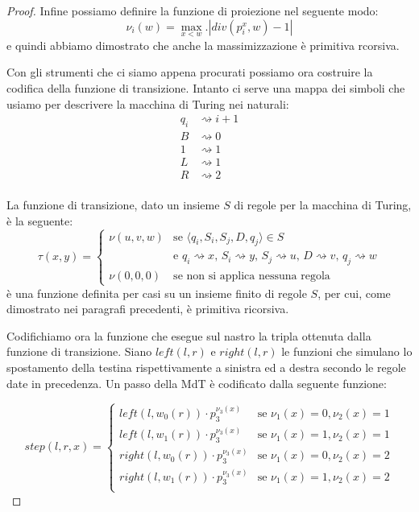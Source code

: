 \begin{proof}
Infine possiamo definire la funzione di proiezione nel seguente modo:
$$\nu_i(w) = \max_{x<w}.\left| div(p_i^x, w) - 1\right|$$ e quindi
abbiamo dimostrato che anche la massimizzazione è primitiva rcorsiva.

Con gli strumenti che ci siamo appena procurati possiamo ora costruire
la codifica della funzione di transizione. Intanto ci serve una mappa
dei simboli che usiamo per descrivere la macchina di Turing nei
naturali:
\begin{align*}
q_i &\rightsquigarrow i+1\\
B &\rightsquigarrow 0\\
1 &\rightsquigarrow 1\\
L &\rightsquigarrow 1\\
R &\rightsquigarrow 2\\
\end{align*}

La funzione di transizione, dato un insieme $S$ di regole per la
macchina di Turing, è la seguente:
$$\tau(x,y) = \left\{
\begin{array}{ll}
\nu(u,v,w) & \text{se $\langle q_i, S_i, S_j, D, q_j \rangle \in
  S$}\\ & \text{e $q_i \rightsquigarrow x$, $S_i \rightsquigarrow y$,
  $S_j \rightsquigarrow u$, $D \rightsquigarrow v$, $q_j
  \rightsquigarrow w$}\\ \nu(0,0,0) & \text{se non si applica nessuna
  regola}
\end{array}
\right.$$ è una funzione definita per casi su un insieme finito di
regole $S$, per cui, come dimostrato nei paragrafi precedenti, è
primitiva ricorsiva.

Codifichiamo ora la funzione che esegue sul nastro la tripla ottenuta
dalla funzione di transizione. Siano $left(l,r)$ e $right(l,r)$ le
funzioni che simulano lo spostamento della testina rispettivamente a
sinistra ed a destra secondo le regole date in precedenza. Un passo
della MdT è codificato dalla seguente funzione:

$$step(l,r,x) = \left\{
\begin{array}{ll}
left(l, w_0(r)) \cdot p_3^{\nu_3(x)} & \text{se }\nu_1(x) = 0, \nu_2(x) = 1\\
left(l, w_1(r)) \cdot p_3^{\nu_3(x)} & \text{se }\nu_1(x) = 1, \nu_2(x) = 1\\
right(l, w_0(r)) \cdot p_3^{\nu_3(x)} & \text{se }\nu_1(x) = 0, \nu_2(x) = 2\\
right(l, w_1(r)) \cdot p_3^{\nu_3(x)} & \text{se }\nu_1(x) = 1, \nu_2(x) = 2\\
\end{array}
\right.$$


\end{proof}
